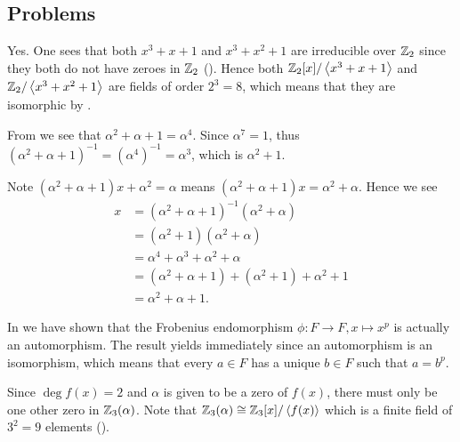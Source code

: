 \subsection*{Problems}
\begin{questions}
    \item Yes. One sees that both $x^3 + x + 1$ and $x^3 + x^2 + 1$ are irreducible over $\mathbb{Z}_2$ since they both do not have zeroes in $\mathbb{Z}_2$ (). Hence both $\mathbb{Z}_2[x]/\left\langle x^3+x+1\right\rangle$ and $\mathbb{Z}_2/\left\langle x^3+x^2+1\right\rangle$ are fields of order $2^3 = 8$, which means that they are isomorphic by .

    \item \begin{partquestions}{\roman*}
        \item From  we see that $\alpha^2 + \alpha + 1 = \alpha^4$. Since $\alpha^7 = 1$, thus $(\alpha^2 + \alpha + 1)^{-1} = (\alpha^4)^{-1} = \alpha^3$, which is $\alpha^2 + 1$.

        \item Note $(\alpha^2 + \alpha + 1)x + \alpha^2 = \alpha$ means $(\alpha^2 + \alpha + 1)x = \alpha^2 + \alpha$. Hence we see
        \begin{align*}
            x &= (\alpha^2+\alpha+1)^{-1}(\alpha^2 + \alpha)\\
            &= (\alpha^2 + 1)(\alpha^2 + \alpha)\\
            &= \alpha^4 + \alpha^3 + \alpha^2 + \alpha\\
            &= (\alpha^2 + \alpha + 1) + (\alpha^2 + 1) + \alpha^2 + 1\\
            &= \alpha^2 + \alpha + 1.
        \end{align*}
    \end{partquestions}

    \item In  we have shown that the Frobenius endomorphism $\phi: F \to F, x \mapsto x^p$ is actually an automorphism. The result yields immediately since an automorphism is an isomorphism, which means that every $a \in F$ has a unique $b \in F$ such that $a = b^p$.

    \item Since $\deg f(x) = 2$ and $\alpha$ is given to be a zero of $f(x)$, there must only be one other zero in $\mathbb{Z}_3(\alpha)$. Note that $\mathbb{Z}_3(\alpha) \cong \mathbb{Z}_3[x]/\left\langle f(x)\right\rangle$ which is a finite field of $3^2 = 9$ elements ().


\end{questions}

